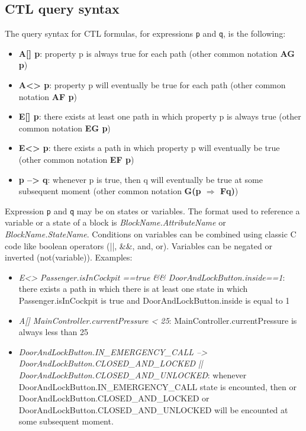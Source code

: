 \documentclass[12pt]{article}
\begin{document}
\subsection{CTL query syntax}
The query syntax for CTL formulas, for expressions \texttt{p} and \texttt{q}, is the following:
\begin{itemize}
	\item \textbf{A[] p}: property p is always true for each path (other common notation \textbf{AG p})
	\item \textbf{A<> p}: property p will eventually be true for each path (other common notation \textbf{AF p})
	\item \textbf{E[] p}: there exists at least one path in which property p is always true (other common notation \textbf{EG p})
	\item \textbf{E<> p}:  there exists a path in which property p will eventually be true (other common notation \textbf{EF p})
	\item \textbf{p --> q}: whenever p is true, then q will eventually be true at some subsequent moment (other common notation \textbf{G(p $\Rightarrow$ Fq)})
\end{itemize}
Expression \texttt{p} and \texttt{q} may be on states or variables. The format used to reference a variable or a state of a block is \textit{BlockName.AttributeName} or \textit{BlockName.StateName}. Conditions on variables can be combined using classic C code like boolean operators (||, \&\&, and, or). Variables can be negated or inverted (not(variable)). Examples:
\begin{itemize}
	\item \textit{E<> Passenger.isInCockpit ==true \&\& DoorAndLockButton.inside==1}: there exists a path in which there is at least one state in which Passenger.isInCockpit is true and DoorAndLockButton.inside is equal to 1
	\item \textit{A[] MainController.currentPressure < 25}: MainController.currentPressure is always less than 25
	\item \textit{DoorAndLockButton.IN\_EMERGENCY\_CALL --> DoorAndLockButton.CLOSED\_AND\_LOCKED || DoorAndLockButton.CLOSED\_AND\_UNLOCKED}: whenever DoorAndLockButton.IN\_EMERGENCY\_CALL state is encounted, then or DoorAndLockButton.CLOSED\_AND\_LOCKED or DoorAndLockButton.CLOSED\_AND\_UNLOCKED will be encounted at some subsequent moment.
\end{itemize}
\end{document}
